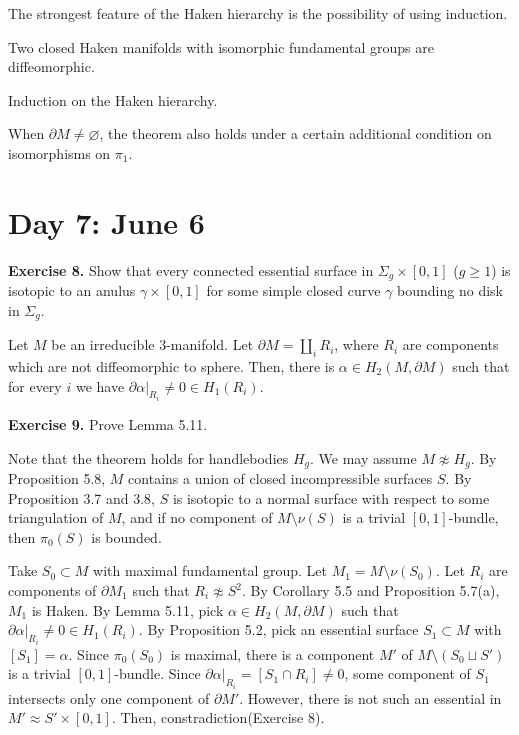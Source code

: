 \documentclass{../../small}
\begin{document}
The strongest feature of the Haken hierarchy is the possibility of using induction.

\begin{thm}[Waldhausen]
Two closed Haken manifolds with isomorphic fundamental groups are diffeomorphic.
\end{thm}
\begin{pf}
Induction on the Haken hierarchy.
\end{pf}

\begin{rmk*}
When $\partial M\ne\varnothing$, the theorem also holds under a certain additional condition on isomorphisms on $\pi_1$.
\end{rmk*}


\newpage
\setcounter{section}{6}
\section{Day 7: June 6}
\setcounter{section}{5}

\noindent\textbf{Exercise 8.} Show that every connected essential surface in $\Sigma_g\times[0,1]$ ($g\ge1$) is isotopic to an anulus $\gamma\times[0,1]$ for some simple closed curve $\gamma$ bounding no disk in $\Sigma_g$.
\setcounter{thm}{10}
\begin{lem}
Let $M$ be an irreducible 3-manifold.
Let $\partial M=\coprod_iR_i$, where $R_i$ are components which are not diffeomorphic to sphere.
Then, there is $\alpha\in H_2(M,\partial M)$ such that for every $i$ we have $\partial\alpha|_{R_i}\ne0\in H_1(R_i)$.
\end{lem}

\noindent\textbf{Exercise 9.} Prove Lemma 5.11.

\begin{pf}
Note that the theorem holds for handlebodies $H_g$.
We may assume $M\not\approx H_g$.
By Proposition 5.8, $M$ contains a union of closed incompressible surfaces $S$.
By Proposition 3.7 and 3.8, $S$ is isotopic to a normal surface with respect to some triangulation of $M$, and if no component of $M\setminus\nu(S)$ is a trivial $[0,1]$-bundle, then $\pi_0(S)$ is bounded.

Take $S_0\subset M$ with maximal fundamental group.
Let $M_1=M\setminus\nu(S_0)$.
Let $R_i$ are components of $\partial M_1$ such that $R_i\not\approx S^2$.
By Corollary 5.5 and Proposition 5.7(a), $M_1$ is Haken.
By Lemma 5.11, pick $\alpha\in H_2(M,\partial M)$ such that $\partial\alpha|_{R_i}\ne0\in H_1(R_i)$.
By Proposition 5.2, pick an essential surface $S_1\subset M$ with $[S_1]=\alpha$.
Since $\pi_0(S_0)$ is maximal, there is a component $M'$ of $M\setminus(S_0\sqcup S')$ is a trivial $[0,1]$-bundle.
Since $\partial\alpha|_{R_i}=[S_1\cap R_i]\ne0$, some component of $S_1$ intersects only one component of $\partial M'$.
However, there is not such an essential in $M'\approx S'\times[0,1]$.
Then, constradiction(Exercise 8).
\end{pf}
\end{document}
